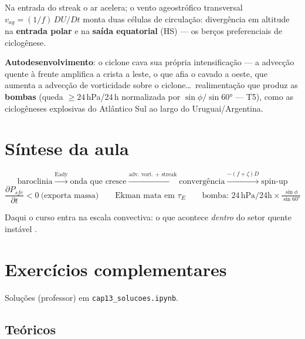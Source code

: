 \documentclass[11pt]{article}
\begin{document}
\begin{formalivro}
Na entrada do streak o ar acelera; o vento ageostrófico transversal
$v_{ag} = (1/f)\,DU/Dt$ monta duas células de circulação: divergência
em altitude na \textbf{entrada polar} e na \textbf{saída equatorial}
(HS) — os berços preferenciais de ciclogênese.
\end{formalivro}

\textbf{Autodesenvolvimento}: o ciclone cava sua própria
intensificação — a advecção quente à frente amplifica a crista a
leste, o que afia o cavado a oeste, que aumenta a advecção de
vorticidade sobre o ciclone\ldots\ realimentação que produz as
\textbf{bombas} (queda $\ge 24$\,hPa/24\,h normalizada por
$\sin\phi/\sin 60°$ — T5), como as ciclogêneses explosivas do
Atlântico Sul ao largo do Uruguai/Argentina.

\section{Síntese da aula}\label{sec:sintese}

\begin{noquadro}
\[ \text{baroclinia} \xrightarrow{\text{Eady}} \text{onda que cresce}
\xrightarrow{\text{adv.\ vort.\ + streak}} \text{convergência}
\xrightarrow{-(f+\zeta)D} \text{spin-up} \]
\[ \frac{\partial P_{sfc}}{\partial t} < 0\ \text{(exporta massa)}
\qquad \text{Ekman mata em } \tau_E \qquad
\text{bomba: } 24\,\mathrm{hPa/24h}\times\tfrac{\sin\phi}{\sin60°} \]
\end{noquadro}

Daqui o curso entra na escala convectiva: o que acontece \emph{dentro}
do setor quente instável .

\section{Exercícios complementares}\label{sec:exercicios}

Soluções (professor) em \texttt{cap13\_solucoes.ipynb}.

\subsection*{Teóricos}
\end{document}
